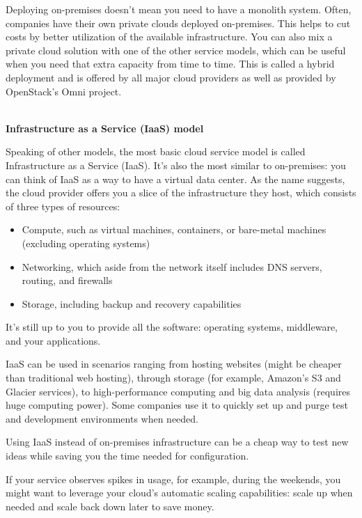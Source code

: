 Deploying on-premises doesn't mean you need to have a monolith system. Often, companies have their own private clouds deployed on-premises. This helps to cut costs by better utilization of the available infrastructure. You can also mix a private cloud solution with one of the other service models, which can be useful when you need that extra capacity from time to time. This is called a hybrid deployment and is offered by all major cloud providers as well as provided by OpenStack's Omni project.


\hspace*{\fill} \\ %
\noindent
\textbf{Infrastructure as a Service (IaaS) model}

Speaking of other models, the most basic cloud service model is called Infrastructure as a Service (IaaS). It's also the most similar to on-premises: you can think of IaaS as a way to have a virtual data center. As the name suggests, the cloud provider offers you a slice of the infrastructure they host, which consists of three types of resources:


\begin{itemize}
\item 
Compute, such as virtual machines, containers, or bare-metal machines (excluding operating systems)


\item 
Networking, which aside from the network itself includes DNS servers, routing, and firewalls


\item 
Storage, including backup and recovery capabilities
\end{itemize}

It's still up to you to provide all the software: operating systems, middleware, and your applications.

IaaS can be used in scenarios ranging from hosting websites (might be cheaper than traditional web hosting), through storage (for example, Amazon's S3 and Glacier services), to high-performance computing and big data analysis (requires huge computing power). Some companies use it to quickly set up and purge test and development environments when needed.

Using IaaS instead of on-premises infrastructure can be a cheap way to test new ideas while saving you the time needed for configuration. 

If your service observes spikes in usage, for example, during the weekends, you might want to leverage your cloud's automatic scaling capabilities: scale up when needed and scale back down later to save money. 

